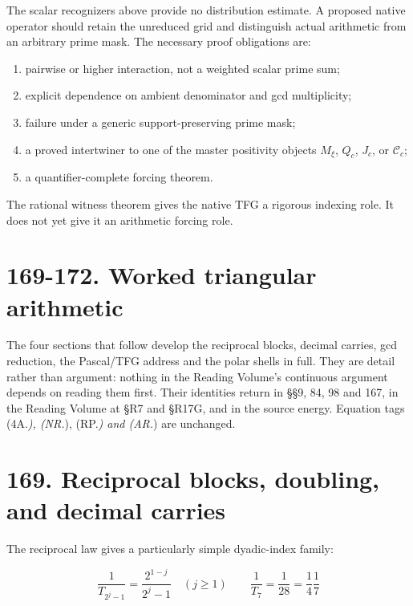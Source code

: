 \documentclass[
  11pt,
]{book}
\providecommand{\tightlist}{%
  \setlength{\itemsep}{0pt}\setlength{\parskip}{0pt}}
\begin{document}
The scalar recognizers above provide no distribution estimate. A
proposed native operator should retain the unreduced grid and
distinguish actual arithmetic from an arbitrary prime mask. The
necessary proof obligations are:

\begin{enumerate}
\def\labelenumi{\arabic{enumi}.}
\tightlist
\item
  pairwise or higher interaction, not a weighted scalar prime sum;
\item
  explicit dependence on ambient denominator and gcd multiplicity;
\item
  failure under a generic support-preserving prime mask;
\item
  a proved intertwiner to one of the master positivity objects
  \(M_\xi\), \(Q_c\), \(J_c\), or \(\mathcal C_c\);
\item
  a quantifier-complete forcing theorem.
\end{enumerate}

The rational witness theorem gives the native TFG a rigorous indexing
role. It does not yet give it an arithmetic forcing role.



\section{169-172. Worked triangular
arithmetic}\label{worked-triangular-arithmetic}

The four sections that follow develop the reciprocal blocks, decimal
carries, gcd reduction, the Pascal/TFG address and the polar shells in
full. They are detail rather than argument: nothing in the Reading
Volume's continuous argument depends on reading them first. Their
identities return in §§9, 84, 98 and 167, in the Reading Volume at §R7
and §R17G, and in the source energy. Equation tags (4A.\emph{), (NR.}),
(RP.\emph{) and (AR.}) are unchanged.

\section{169. Reciprocal blocks, doubling, and decimal
carries}\label{reciprocal-blocks-doubling-and-decimal-carries}

The reciprocal law gives a particularly simple dyadic-index family:

\[
\frac1{T_{2^j-1}}=\frac{2^{1-j}}{2^j-1}\quad(j\ge1)
\qquad \frac1{T_7}=\frac1{28}=\frac14\frac17
\tag{4A.1}
\]
\end{document}
